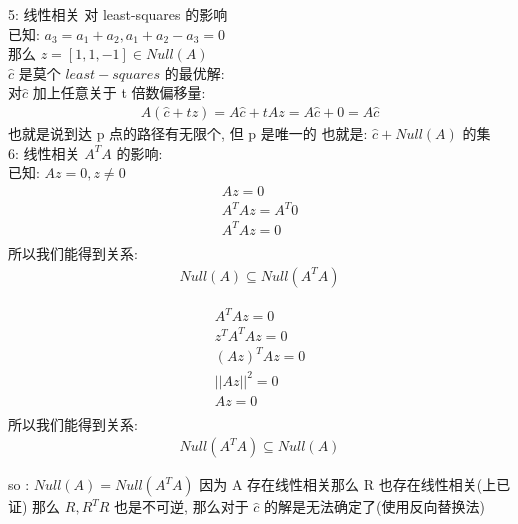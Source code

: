 \documentclass[12pt]{article}
\begin{document}
\begin{flushleft}
    5: 线性相关 对 least-squares 的影响 \\
    已知: $a_{3} = a_{1} + a_{2}, a_{1} + a_{2} - a_{3} = 0$ \\
    那么 $z = [1, 1, -1] \in  Null(A)$ \\
    $\hat{c}$ 是莫个 $least-squares$ 的最优解: \\
    对$\hat{c}$ 加上任意关于 t 倍数偏移量: \\
    \begin{align}
        A(\hat{c} + tz) = A\hat{c} + tAz =  A\hat{c} + 0 = A\hat{c}
    \end{align}
    也就是说到达 p 点的路径有无限个, 但 p 是唯一的 也就是: $\hat{c} + Null(A)$ 的集 \\

    6: 线性相关 $A^{T}A$ 的影响: \\
    已知: $Az = 0, z \neq 0 $ \\
    \begin{align}
        Az = 0           \\
        A^{T}Az = A^{T}0 \\
        A^{T}Az = 0      \\
    \end{align}
    所以我们能得到关系: \\
    \begin{align}
        Null(A) \subseteq Null(A^{T}A)
    \end{align}

    \begin{align}
        A^{T}Az = 0      \\
        z^{T}A^{T}Az = 0 \\
        (Az)^{T} Az = 0  \\
        ||Az||^{2} = 0   \\
        Az = 0           \\
    \end{align}
    所以我们能得到关系: \\
    \begin{align}
        Null(A^{T}A) \subseteq Null(A)
    \end{align}

    so : $Null(A) = Null(A^{T}A)$
    因为 A 存在线性相关那么 R 也存在线性相关(上已证) 那么 $R, R^{T}R$ 也是不可逆, 那么对于 $\hat{c}$ 的解是无法确定了(使用反向替换法)

\end{flushleft}
\end{document}
